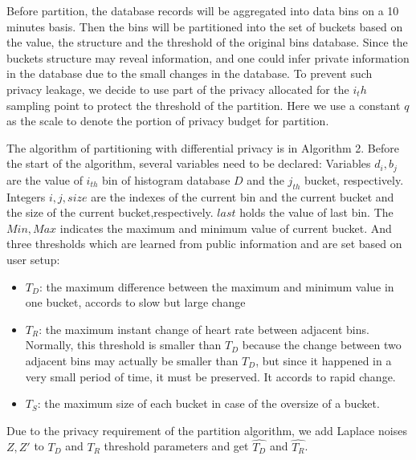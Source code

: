 \documentclass[10pt,conference]{IEEEtran}
\begin{document}
Before partition, the database records will be aggregated into data bins on a 10 minutes basis. Then the bins will be partitioned into the set of buckets based on the value, the structure and the threshold of the original bins database. Since the buckets structure may reveal information, and one could infer private information in the database due to the small changes in the database. To prevent such privacy leakage, we decide to use part of the privacy allocated for the $i_th$ sampling point to protect the threshold of the partition. Here we use a constant $q$ as the scale to denote the portion of privacy budget for partition.


The algorithm of partitioning with differential privacy is in Algorithm 2. Before the start of the algorithm, several variables need to be declared: Variables $d_i,b_j$ are the value of $i_{th}$ bin of histogram database $D$ and the $j_{th}$ bucket, respectively. Integers $i,j,size$ are the indexes of the current bin and the current bucket and the size of the current bucket,respectively. $last$ holds the value of last bin. The $Min, Max$ indicates the maximum and minimum value of current bucket. And three thresholds which are learned from public information and are set based on user setup:
\begin{itemize}
	\item $T_D$: the maximum difference between the maximum and minimum value in one bucket, accords to slow but large change 
	\item $T_R$: the maximum instant change of heart rate between adjacent bins. Normally, this threshold is smaller than $T_D$ because the change between two adjacent bins may actually be smaller than $T_D$, but since it happened in a very small period of time, it must be preserved. It accords to rapid change. 
	\item $T_S$: the maximum size of each bucket in case of the oversize of a bucket.
\end{itemize}

Due to the privacy requirement of the partition algorithm, we add Laplace noises $Z, Z'$ to $T_D$ and $T_R$ threshold parameters and get $\hat{T_D}$ and $\hat{T_R}$.
\end{document}
